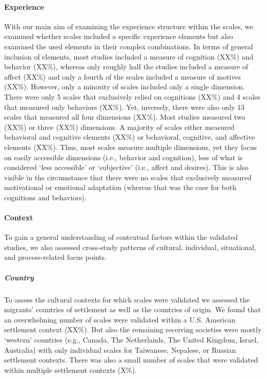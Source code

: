 \documentclass[man, 12pt, a4paper]{apa7}
\begin{document}
\paragraph{Experience}
With our main aim of examining the experience structure within the scales, we examined whether scales included a specific experience elements but also examined the used elements in their complex combinations. In terms of general inclusion of elements, most studies included a measure of cognition (XX\%) and behavior (XX\%), whereas only roughly half the studies included a measure of affect (XX\%) and only a fourth of the scales included a measure of motives (XX\%). However, only a minority of scales included only a single dimension. There were only 5 scales that exclusively relied on cognitions (XX\%) and 4 scales that measured only behaviors (XX\%). Yet, inversely, there were also only 13 scales that measured all four dimensions (XX\%). Most studies measured two (XX\%) or three (XX\%) dimensions. A majority of scales either measured behavioral and cognitive elements (XX\%) or behavioral, cognitive, and affective elements (XX\%). Thus, most scales measure multiple dimensions, yet they focus on easily accessible dimensions (i.e., behavior and cognition), less of what is considered `less accessible' or `subjective' (i.e., affect and desires). This is also visible in the circumstance that there were no scales that exclusively measured motivational or emotional adaptation (whereas that was the case for both cognitions and behaviors).

\vspace{1em}

\paragraph{Context}
To gain a general understanding of contextual factors within the validated studies, we also assessed cross-study patterns of cultural, individual, situational, and process-related focus points.

\subparagraph{Country}
To assess the cultural contexts for which scales were validated we assessed the migrants' countries of settlement as well as the countries of origin. We found that an overwhelming number of scales were validated within a U.S. American settlement context (XX\%). But also the remaining receiving societies were mostly `western' countries (e.g., Canada, The Netherlands, The United Kingdom, Israel, Australia) with only individual scales for Taiwanese, Nepalese, or Russian settlement contexts. There was also a small number of scales that were validated within multiple settlement contexts (X\%).
\end{document}
